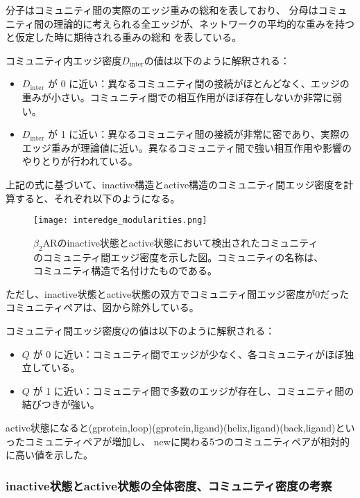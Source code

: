 分子はコミュニティ間の実際のエッジ重みの総和を表しており、
分母はコミュニティ間の理論的に考えられる全エッジが、ネットワークの平均的な重みを持つと仮定した時に期待される重みの総和
を表している。

コミュニティ内エッジ密度$D_{\text{inter}}$の値は以下のように解釈される：
\begin{itemize}
    \item \( D_{\text{inter}} \) が 0 に近い：異なるコミュニティ間の接続がほとんどなく、エッジの重みが小さい。コミュニティ間での相互作用がほぼ存在しないか非常に弱い。
    \item \( D_{\text{inter}} \) が 1 に近い：異なるコミュニティ間の接続が非常に密であり、実際のエッジ重みが理論値に近い。異なるコミュニティ間で強い相互作用や影響のやりとりが行われている。
\end{itemize}


上記の式に基づいて、inactive構造とactive構造のコミュニティ間エッジ密度を計算すると、それぞれ以下のようになる。

\begin{figure}[htbp]
    \centering
    \texttt{[image: interedge\_modularities.png]}
    \caption{$\beta_2$ARのinactive状態とactive状態において検出されたコミュニティのコミュニティ間エッジ密度を示した図。コミュニティの名称は、コミュニティ構造で名付けたものである。}
    \label{fig:inter}
\end{figure}

\newpage

ただし、inactive状態とactive状態の双方でコミュニティ間エッジ密度が0だったコミュニティペアは、図から除外している。

コミュニティ間エッジ密度$Q$の値は以下のように解釈される：
\begin{itemize}
    \item \( Q \) が 0 に近い：コミュニティ間でエッジが少なく、各コミュニティがほぼ独立している。
    \item \( Q \) が 1 に近い：コミュニティ間で多数のエッジが存在し、コミュニティ間の結びつきが強い。
\end{itemize}

active状態になると(gprotein,loop)(gprotein,ligand)(helix,ligand)(back,ligand)といったコミュニティペアが増加し、
newに関わる5つのコミュニティペアが相対的に高い値を示した。


\subsubsection{inactive状態とactive状態の全体密度、コミュニティ密度の考察}

